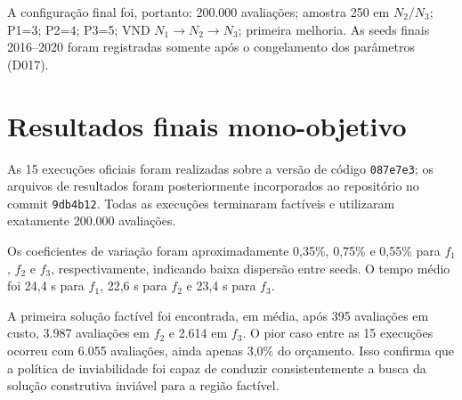 \documentclass[10pt,twocolumn,a4paper]{article}
\begin{document}
A configuração final foi, portanto: 200.000 avaliações; amostra 250 em $N_2/N_3$; P1=3; P2=4; P3=5; VND $N_1 \to N_2 \to N_3$; primeira melhoria. As seeds finais 2016--2020 foram registradas somente após o congelamento dos parâmetros (D017).

\section{Resultados finais mono-objetivo}
\label{sec:resultados_mono}

As 15 execuções oficiais foram realizadas sobre a versão de código \texttt{087e7e3}; os arquivos de resultados foram posteriormente incorporados ao repositório no commit \texttt{9db4b12}. Todas as execuções terminaram factíveis e utilizaram exatamente 200.000 avaliações.

\begin{table}[t]
\centering
\caption{Resultados finais das cinco execuções por objetivo (sementes 2016--2020) e estatísticas agregadas.}
\label{tab:resultados_finais}
\end{table}

Os coeficientes de variação foram aproximadamente 0,35\%, 0,75\% e 0,55\% para $f_1$, $f_2$ e $f_3$, respectivamente, indicando baixa dispersão entre seeds. O tempo médio foi 24,4 s para $f_1$, 22,6 s para $f_2$ e 23,4 s para $f_3$.

A primeira solução factível foi encontrada, em média, após 395 avaliações em custo, 3.987 avaliações em $f_2$ e 2.614 em $f_3$. O pior caso entre as 15 execuções ocorreu com 6.055 avaliações, ainda apenas 3,0\% do orçamento. Isso confirma que a política de inviabilidade foi capaz de conduzir consistentemente a busca da solução construtiva inviável para a região factível.
\end{document}
